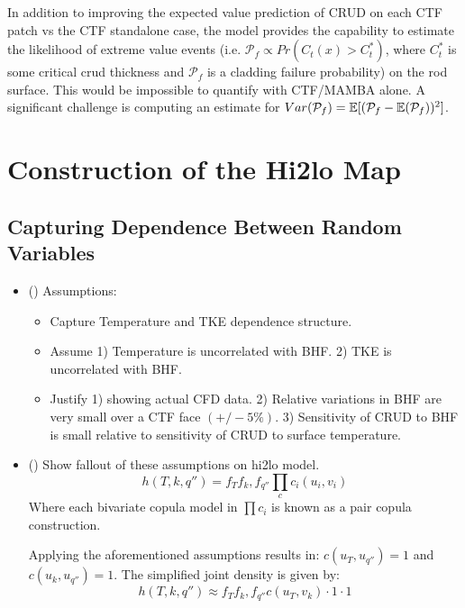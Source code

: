 In addition to improving the expected value prediction of CRUD on each CTF patch vs the CTF standalone case, the model provides the capability to estimate the likelihood of extreme value events (i.e. $\mathcal P_f \propto Pr(C_t(x) > C_t^*)$, where $C_t^*$ is some critical crud thickness and $\mathcal P_f$ is a cladding failure probability) on the rod surface.  This would be impossible to quantify with CTF/MAMBA alone.  A significant challenge is computing an estimate for $Var(\mathcal P_f) = \operatorname*{\mathbb{E}}[(\mathcal P_f - \operatorname*{\mathbb{E}}(\mathcal P_f))^2]$.


\section{Construction of the Hi2lo Map}

\subsection{Capturing Dependence Between Random Variables}
\begin{itemize}
        \item (\checkmark) Assumptions:
        \begin{itemize}
                \item Capture Temperature and TKE dependence structure.
                \item Assume 1) Temperature is uncorrelated with BHF.  2) TKE is uncorrelated with BHF.
                \item Justify 1) showing actual CFD data. 2) Relative variations in BHF are very small over a CTF face $(+/- 5\%)$.  3) Sensitivity of CRUD to BHF is small relative to sensitivity of CRUD to surface temperature.
        \end{itemize}
        \item (\checkmark) Show fallout of these assumptions on hi2lo model.
        \begin{equation}
                h(T, k, q'') = f_T f_k, f_{q''} \prod_c c_i(u_i, v_i)
        \end{equation}
        Where each bivariate copula model in $\prod c_i $ is known as a pair copula construction.

        Applying the aforementioned assumptions results in: $c(u_T, u_{q''}) = 1$ and $c(u_{k}, u_{q''}) = 1$. The simplified joint density is given by:
        \begin{equation}
                h(T, k, q'') \approx  f_T f_k, f_{q''} c(u_{T}, v_{k})  \cdot 1 \cdot 1
    \end{equation}
\end{itemize}

